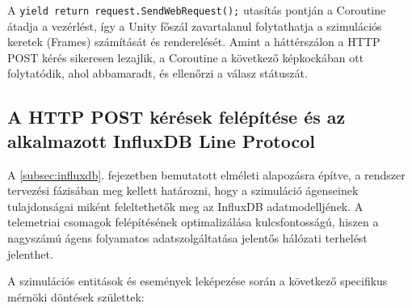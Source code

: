 A \texttt{yield return request.SendWebRequest();} utasítás pontján a Coroutine átadja a vezérlést, így a Unity főszál zavartalanul folytathatja a szimulációs keretek (Frames) számítását és renderelését. Amint a háttérszálon a HTTP POST kérés sikeresen lezajlik, a Coroutine a következő képkockában ott folytatódik, ahol abbamaradt, és ellenőrzi a válasz státuszát.

\subsection{A HTTP POST kérések felépítése és az alkalmazott InfluxDB Line Protocol}
\label{subsec:line_protocol_implementacio}

A \ref{subsec:influxdb}. fejezetben bemutatott elméleti alapozásra építve, a rendszer tervezési fázisában meg kellett határozni, hogy a szimuláció ágenseinek tulajdonságai miként feleltethetők meg az InfluxDB adatmodelljének. A telemetriai csomagok felépítésének optimalizálása kulcsfontosságú, hiszen a nagyszámú ágens folyamatos adatszolgáltatása jelentős hálózati terhelést jelenthet.

A szimulációs entitások és események leképezése során a következő specifikus mérnöki döntések születtek:

